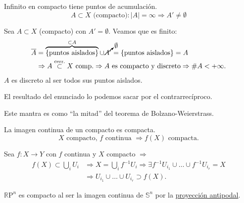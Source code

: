\begin{prop}[Mantra 2]
Infinito en compacto tiene puntos de acumulación.
\[
A \subset X \text{ (compacto)}: \lvert A \rvert = \infty \Rightarrow A' \neq \emptyset
\]
\end{prop}
\begin{demo}
Sea $A \subset X$ (compacto) con $A' = \emptyset$. Veamos que es finito:
\begin{align*}
    \overline{A} &= \overbrace{\{\text{puntos aislados}\}}^{\subset A} \cup \cancelto{\emptyset}{A'} = \{\text{puntos aislados}\} = A\\
     &\Rightarrow A \stackrel{\text{cerr.}}{\subset} X \text{ comp.} \Rightarrow A \text{ es compacto y discreto} \Rightarrow \#A < +\infty   
.\end{align*}
$A$ es discreto al ser todos sus puntos aislados. 

El resultado del enunciado lo podemos sacar por el contrarrecíproco.
\end{demo}

\begin{obs}
Este mantra es como ``la mitad'' del teorema de Bolzano-Weierstrass.
\end{obs}

\begin{prop}[Mantra 3]
La imagen continua de un compacto es compacta. 
\[
X \text{ compacto, } f \text{ continua } \Rightarrow f\left( X \right) \text{ compacta.}
\]
\end{prop}
\begin{demo}
Sea $f: X \rightarrow Y$ con $f$ continua y $X$ compacto $\Rightarrow$
\begin{align*}
    f\left( X \right) \subset \bigcup_{i} U_i &\Rightarrow X = \bigcup_{i} f^{-1} U_i \Rightarrow \exists f^{-1}U_{i_1} \cup \ldots \cup f^{-1}U_{i_r} = X\\
     &\Rightarrow U_{i_1} \cup \ldots \cup U_{i_r} \supset f\left( X \right) 
.\end{align*}
\end{demo}

\begin{ej}
$\mathbb{R} \mathrm{P}^n$ es compacto al ser la imagen continua de $\mathbb{S}^n$ por la \underline{proyección antipodal}. 
\end{ej}

